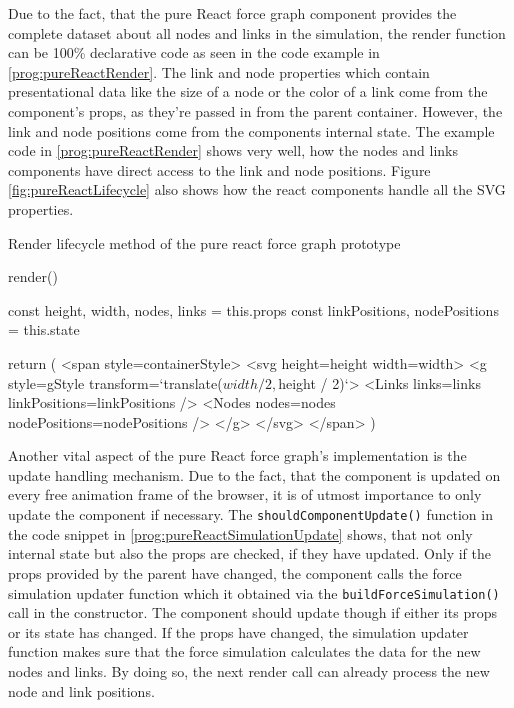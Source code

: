 Due to the fact, that the pure React force graph component provides the complete dataset about all nodes and links in the simulation, the render function can be 100\% declarative code as seen in the code example in \ref{prog:pureReactRender}. The link and node properties which contain presentational data like the size of a node or the color of a link come from the component's props, as they're passed in from the parent container. However, the link and node positions come from the components internal state. The example code in \ref{prog:pureReactRender} shows very well, how the nodes and links components have direct access to the link and node positions. Figure \ref{fig:pureReactLifecycle} also shows how the react components handle all the SVG properties.

\begin{program}
\caption{Render lifecycle method of the pure react force graph prototype}
\label{prog:pureReactRender}
\begin{JsCode}
render() {
  const { height, width, nodes, links } = this.props
  const { linkPositions, nodePositions } = this.state
  
  return (
    <span style={containerStyle}>
      <svg height={height} width={width}>
        <g style={gStyle} transform={`translate(${width / 2},${height / 2})`}>
          <Links links={links} linkPositions={linkPositions} />
          <Nodes nodes={nodes} nodePositions={nodePositions} />
        </g>
      </svg>
    </span>
  )
}
\end{JsCode}
\end{program}

Another vital aspect of the pure React force graph's implementation is the update handling mechanism. Due to the fact, that the component is updated on every free animation frame of the browser, it is of utmost importance to only update the component if necessary. The \texttt{shouldComponentUpdate()} function in the code snippet in \ref{prog:pureReactSimulationUpdate} shows, that not only internal state but also the props are checked, if they have updated. Only if the props provided by the parent have changed, the component calls the force simulation updater function which it obtained via the \texttt{buildForceSimulation()} call in the constructor. The component should update though if either its props or its state has changed. If the props have changed, the simulation updater function makes sure that the force simulation calculates the data for the new nodes and links. By doing so, the next render call can already process the new node and link positions.

